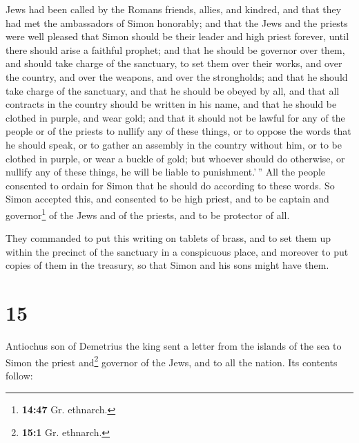 Jews had been called by the Romans friends, allies, and kindred, and
that they had met the ambassadors of Simon honorably; 
and that the Jews and the priests were well pleased that Simon should be
their leader and high priest forever, until there should arise a
faithful prophet;  and that he should be governor over
them, and should take charge of the sanctuary, to set them over their
works, and over the country, and over the weapons, and over the
strongholds; and that he should take charge of the sanctuary,
 and that he should be obeyed by all, and that all
contracts in the country should be written in his name, and that he
should be clothed in purple, and wear gold;  and that it
should not be lawful for any of the people or of the priests to nullify
any of these things, or to oppose the words that he should speak, or to
gather an assembly in the country without him, or to be clothed in
purple, or wear a buckle of gold;  but whoever should do
otherwise, or nullify any of these things, he will be liable to
punishment.'\,''  All the people consented to ordain for
Simon that he should do according to these words.  So
Simon accepted this, and consented to be high priest, and to be captain
and governor\footnote{\textbf{14:47} Gr. ethnarch.} of the Jews and of
the priests, and to be protector of all.

 They commanded to put this writing on tablets of brass,
and to set them up within the precinct of the sanctuary in a conspicuous
place,  and moreover to put copies of them in the
treasury, so that Simon and his sons might have them.

\hypertarget{section-14}{%
\section{15}\label{section-14}}

 Antiochus son of Demetrius the king sent a letter from
the islands of the sea to Simon the priest and\footnote{\textbf{15:1}
  Gr. ethnarch.} governor of the Jews, and to all the nation.
 Its contents follow:

